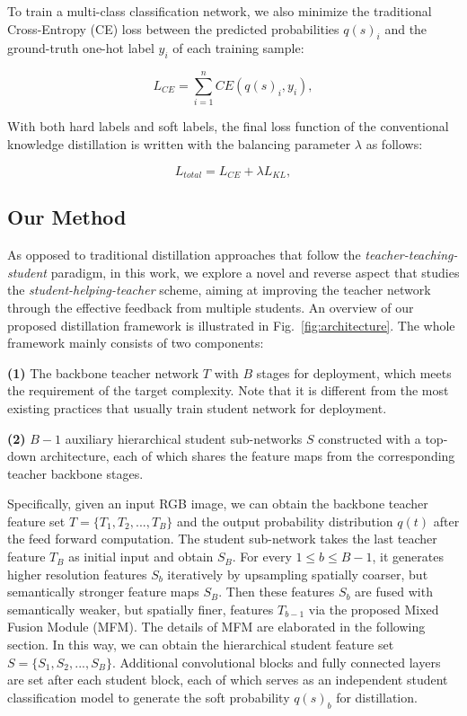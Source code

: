 \documentclass[letterpaper]{article} %
\begin{document}
To train a multi-class classification network, we also minimize the traditional Cross-Entropy (CE) loss between the predicted probabilities $q(s)_{i}$ and the ground-truth one-hot label $y_{i}$ of each training sample:

\begin{equation}
L_{CE} = \sum_{i=1}^{n}CE(q(s)_{i}, y_{i}),
\end{equation}

With both hard labels and soft labels, the final loss function of the conventional knowledge distillation is written with the balancing parameter $\lambda$ as follows:

\begin{equation}
L_{total}=L_{CE}+\lambda L_{KL},
\end{equation}

\subsection{Our Method}
As opposed to traditional distillation approaches that follow the \textit{teacher-teaching-student} paradigm,
in this work, we explore a novel and reverse aspect that studies the \textit{student-helping-teacher} scheme, aiming at improving the teacher network through the effective feedback from multiple students. An overview of our proposed distillation framework is illustrated in Fig.~\ref{fig:architecture}. The whole framework mainly consists of two components: 

\noindent\textbf{(1)} The backbone teacher network $T$ with $B$ stages for deployment, which meets the requirement of the target complexity.
Note that it is different from the most existing practices that usually train student network for deployment.

\noindent\textbf{(2)} $B-1$ auxiliary hierarchical student sub-networks $S$ constructed with a top-down architecture, each of which shares the feature maps from the corresponding teacher backbone stages.

Specifically, given an input RGB image, we can obtain the backbone teacher feature set $T=\{T_{1}, T_{2}, ..., T_{B}\}$ and the output probability distribution $q(t)$ after the feed forward computation. The student sub-network takes the last teacher feature $T_{B}$ as initial input and obtain $S_{B}$. For every $1\le b\le B-1$, it generates higher resolution features $S_{b}$ iteratively by upsampling spatially coarser, but semantically stronger feature maps $S_{B}$. Then these features $S_{b}$ are fused with semantically weaker, but spatially finer, features $T_{b-1}$ via the proposed Mixed Fusion Module (MFM). The details of MFM are elaborated in the following section. In this way, we can obtain the hierarchical student feature set $S=\{S_{1}, S_{2}, ..., S_{B}\}$. Additional convolutional blocks and fully connected layers are set after each student block, each of which serves as an independent student classification model to generate the soft probability $q(s)_{b}$ for distillation.
\end{document}
